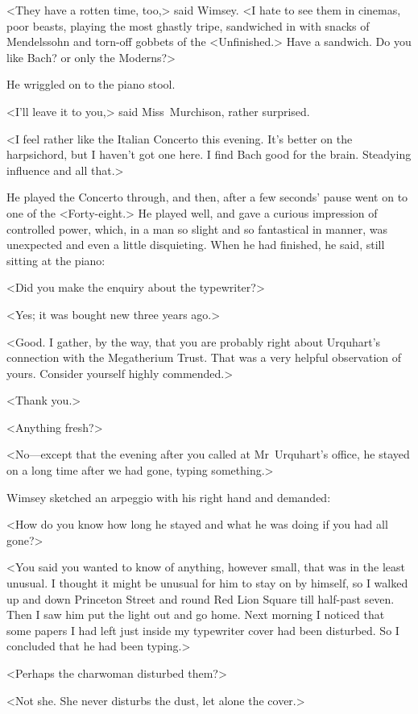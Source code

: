 <They have a rotten time, too,> said Wimsey. <I hate to see them in cinemas, poor beasts, playing the most ghastly tripe, sandwiched in with snacks of Mendelssohn and torn-off gobbets of the <Unfinished.> Have a sandwich. Do you like Bach? or only the Moderns?>

He wriggled on to the piano stool.

<I'll leave it to you,> said Miss~Murchison, rather surprised.

<I feel rather like the Italian Concerto this evening. It's better on the harpsichord, but I haven't got one here. I find Bach good for the brain. Steadying influence and all that.>

He played the Concerto through, and then, after a few seconds' pause went on to one of the <Forty-eight.> He played well, and gave a curious impression of controlled power, which, in a man so slight and so fantastical in manner, was unexpected and even a little disquieting. When he had finished, he said, still sitting at the piano:

<Did you make the enquiry about the typewriter?>

<Yes; it was bought new three years ago.>

<Good. I gather, by the way, that you are probably right about Urquhart's connection with the Megatherium Trust. That was a very helpful observation of yours. Consider yourself highly commended.>

<Thank you.>

<Anything fresh?>

<No—except that the evening after you called at Mr~Urquhart's office, he stayed on a long time after we had gone, typing something.>

Wimsey sketched an arpeggio with his right hand and demanded:

<How do you know how long he stayed and what he was doing if you had all gone?>

<You said you wanted to know of anything, however small, that was in the least unusual. I thought it might be unusual for him to stay on by himself, so I walked up and down Princeton Street and round Red Lion Square till half-past seven. Then I saw him put the light out and go home. Next morning I noticed that some papers I had left just inside my typewriter cover had been disturbed. So I concluded that he had been typing.>

<Perhaps the charwoman disturbed them?>

<Not she. She never disturbs the dust, let alone the cover.>

